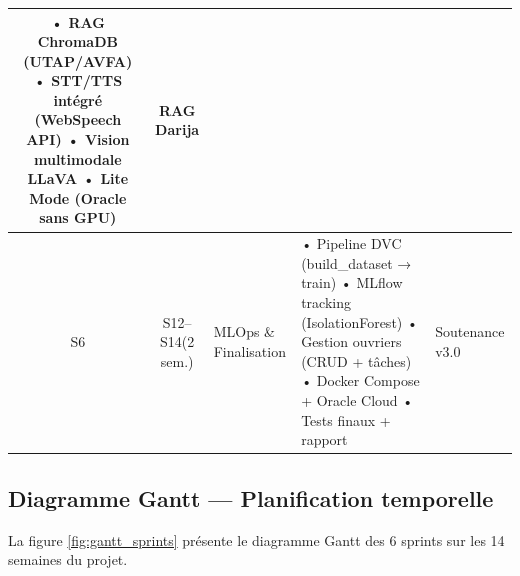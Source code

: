 \begin{table}[H]
\begin{tabular}{ccp{2.2cm}p{5.5cm}p{2.5cm}}
  • RAG ChromaDB (UTAP/AVFA)\newline
  • STT/TTS intégré (WebSpeech API)\newline
  • Vision multimodale LLaVA\newline
  • Lite Mode (Oracle sans GPU)
  & RAG Darija \\
\midrule
S6 & S12--S14\newline(2 sem.) & MLOps \& Finalisation &
  • Pipeline DVC (build\_dataset → train)\newline
  • MLflow tracking (IsolationForest)\newline
  • Gestion ouvriers (CRUD + tâches)\newline
  • Docker Compose + Oracle Cloud\newline
  • Tests finaux + rapport
  & Soutenance v3.0 \\
\bottomrule
\end{tabular}
\end{table}

\subsection{Diagramme Gantt — Planification temporelle}

La figure \ref{fig:gantt_sprints} présente le diagramme Gantt des 6 sprints sur
les 14 semaines du projet.

